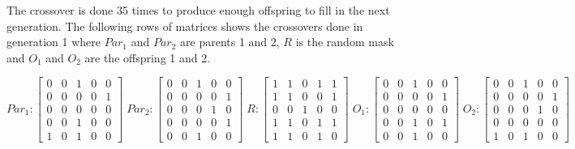     The crossover is done 35 times to produce enough offspring to fill in the next generation. The following rows of matrices shows the crossovers done in generation 1 where $Par_1$ and $Par_2$ are parents 1 and 2, $R$ is the random mask and $O_1$ and $O_2$ are the offspring 1 and 2.
    
    \singlespacing
    \fontsize{10}{12}\selectfont
    $$
        Par_{1} : \begin{bmatrix}
            0 & 0 & 1 & 0 & 0 \\
            0 & 0 & 0 & 0 & 1 \\
            0 & 0 & 0 & 0 & 0 \\
			0 & 0 & 1 & 0 & 0 \\
            1 & 0 & 1 & 0 & 0 
        \end{bmatrix}
        \;
         Par_{2} : \begin{bmatrix}
            0 & 0 & 1 & 0 & 0 \\
            0 & 0 & 0 & 0 & 1 \\
            0 & 0 & 0 & 1 & 0 \\
            0 & 0 & 0 & 0 & 1 \\
            0 & 0 & 1 & 0 & 0
        \end{bmatrix}
        \;
        R : \begin{bmatrix}
            1 & 1 & 0 & 1 & 1 \\
            1 & 1 & 0 & 0 & 1 \\
            0 & 0 & 1 & 0 & 0 \\
            1 & 1 & 0 & 1 & 1 \\
            1 & 1 & 0 & 1 & 0
        \end{bmatrix}
        \;
        O_{1} : \begin{bmatrix}
            0 & 0 & 1 & 0 & 0 \\
            0 & 0 & 0 & 0 & 1 \\
            0 & 0 & 0 & 0 & 0 \\
            0 & 0 & 1 & 0 & 1 \\
            0 & 0 & 1 & 0 & 0
        \end{bmatrix}
        \;
        O_{2} : \begin{bmatrix}
            0 & 0 & 1 & 0 & 0 \\
            0 & 0 & 0 & 0 & 1 \\
            0 & 0 & 0 & 1 & 0 \\
            0 & 0 & 0 & 0 & 0 \\
            1 & 0 & 1 & 0 & 0
        \end{bmatrix}
    $$
